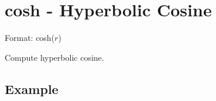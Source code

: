 
%

\section{cosh - Hyperbolic Cosine\label{sect:cosh}}

Format: cosh($r$)

Compute hyperbolic cosine. 

\subsection*{Example}


%

